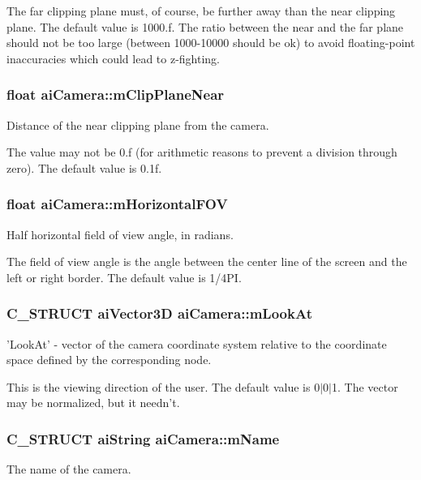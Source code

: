 \-The far clipping plane must, of course, be further away than the near clipping plane. \-The default value is 1000.\-f. \-The ratio between the near and the far plane should not be too large (between 1000-\/10000 should be ok) to avoid floating-\/point inaccuracies which could lead to z-\/fighting. \hypertarget{structaiCamera_a720e8c94c036dcefe4b13cc1c69c521e}{
\subsubsection[{m\-Clip\-Plane\-Near}]{\setlength{\rightskip}{0pt plus 5cm}float {\bf ai\-Camera\-::m\-Clip\-Plane\-Near}}}\label{structaiCamera_a720e8c94c036dcefe4b13cc1c69c521e}
\-Distance of the near clipping plane from the camera.

\-The value may not be 0.\-f (for arithmetic reasons to prevent a division through zero). \-The default value is 0.\-1f. \hypertarget{structaiCamera_adcdea73ece19ea0a9068f5544ec23592}{
\subsubsection[{m\-Horizontal\-F\-O\-V}]{\setlength{\rightskip}{0pt plus 5cm}float {\bf ai\-Camera\-::m\-Horizontal\-F\-O\-V}}}\label{structaiCamera_adcdea73ece19ea0a9068f5544ec23592}
\-Half horizontal field of view angle, in radians.

\-The field of view angle is the angle between the center line of the screen and the left or right border. \-The default value is 1/4\-P\-I. \hypertarget{structaiCamera_af9463249ac870e030fa435b1186cef23}{
\subsubsection[{m\-Look\-At}]{\setlength{\rightskip}{0pt plus 5cm}\-C\-\_\-\-S\-T\-R\-U\-C\-T {\bf ai\-Vector3\-D} {\bf ai\-Camera\-::m\-Look\-At}}}\label{structaiCamera_af9463249ac870e030fa435b1186cef23}
'\-Look\-At' -\/ vector of the camera coordinate system relative to the coordinate space defined by the corresponding node.

\-This is the viewing direction of the user. \-The default value is 0$|$0$|$1. \-The vector may be normalized, but it needn't. \hypertarget{structaiCamera_aa6a5fe5e04b3db1b23f69eb9910c6816}{
\subsubsection[{m\-Name}]{\setlength{\rightskip}{0pt plus 5cm}\-C\-\_\-\-S\-T\-R\-U\-C\-T {\bf ai\-String} {\bf ai\-Camera\-::m\-Name}}}\label{structaiCamera_aa6a5fe5e04b3db1b23f69eb9910c6816}
\-The name of the camera.

